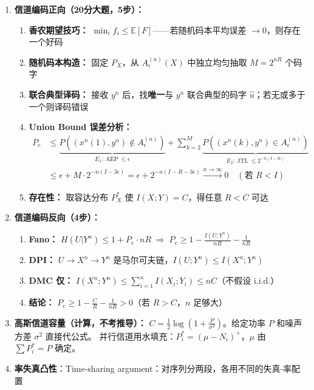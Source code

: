 \documentclass[12pt,a4paper]{ctexart}
\theoremstyle{definition}
\newcommand{\EE}{\mathbb{E}}
\begin{document}
\begin{enumerate}[label=\textbf{\arabic*.}, leftmargin=*]
  \item \textbf{信道编码正向（20分大题，5步）：}
  \begin{enumerate}[nosep]
    \item \textbf{香农期望技巧：} $\min_i f_i \leq \EE[F]$——若随机码本平均误差 $\to 0$，则存在一个好码
    \item \textbf{随机码本构造：} 固定 $P_X$，从 $A_\epsilon^{(n)}(X)$ 中独立均匀抽取 $M=2^{nR}$ 个码字
    \item \textbf{联合典型译码：} 接收 $y^n$ 后，找\textbf{唯一}与 $y^n$ 联合典型的码字 $\hat{u}$；若无或多于一个则译码错误
    \item \textbf{Union Bound 误差分析：}
    \begin{align*}
    P_e &\leq \underbrace{P((x^n(1),y^n)\notin A_\epsilon^{(n)})}_{E_1:\ \text{AEP}\ \leq\epsilon}
          + \sum_{k=2}^{M} \underbrace{P((x^n(k),y^n)\in A_\epsilon^{(n)})}_{E_2:\ \text{JTL}\ \leq 2^{-n(I-3\epsilon)}} \\
        &\leq \epsilon + M\cdot 2^{-n(I-3\epsilon)}
          = \epsilon + 2^{-n(I-R-3\epsilon)} \xrightarrow{n\to\infty} 0 \quad (\text{若 } R<I)
    \end{align*}
    \item \textbf{存在性：} 取容达分布 $P_X^*$ 使 $I(X;Y)=C$，得任意 $R<C$ 可达
  \end{enumerate}

  \item \textbf{信道编码反向（4步）：}
  \begin{enumerate}[nosep]
    \item \textbf{Fano：} $H(U|Y^n) \leq 1 + P_e \cdot nR \;\Rightarrow\; P_e \geq 1 - \frac{I(U;Y^n)}{nR} - \frac{1}{nR}$
    \item \textbf{DPI：} $U\to X^n\to Y^n$ 是马尔可夫链，$I(U;Y^n) \leq I(X^n;Y^n)$
    \item \textbf{DMC 仅：} $I(X^n;Y^n) \leq \sum_{i=1}^n I(X_i;Y_i) \leq nC$（不假设 i.i.d.）
    \item \textbf{结论：} $P_e \geq 1 - \frac{C}{R} - \frac{1}{nR} > 0$（若 $R>C$，$n$ 足够大）
  \end{enumerate}

  \item \textbf{高斯信道容量（计算，不考推导）：}
  $C = \frac{1}{2}\log(1 + \frac{P}{\sigma^2})$。给定功率 $P$ 和噪声方差 $\sigma^2$ 直接代公式。
  并行信道用水填充：$P_i^* = (\mu - N_i)^+$，$\mu$ 由 $\sum P_i^* = P$ 确定。

  \item \textbf{率失真凸性}：Time-sharing argument：对序列分两段，各用不同的失真-率配置


\end{enumerate}
\end{document}
